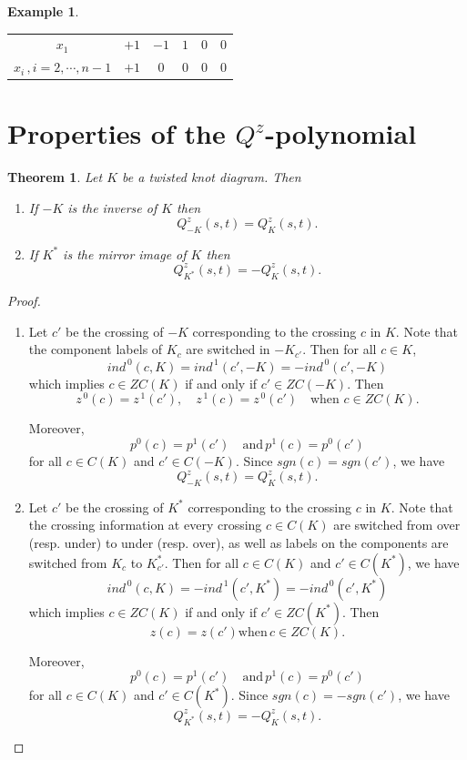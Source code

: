 \documentclass[10pt,a4paper,reqno]{amsart}
\newtheorem{theorem}{Theorem}[section]
\theoremstyle{definition}
\newtheorem{example}{Example}[section]
\theoremstyle{remark}
\begin{document}
\begin{example}
\begin{longtable}{|c|c|c|c|c|c|}
	$x_{1}$ &$+1$ & $-1$&  $1$ & $0$ & $0$ \\
	$x_{i}\,, i=2,\cdots,n-1$ & $+1$ &  $0$ & $0$ & $0$ & $0$ \\
\end{longtable}
\end{example}

\section{Properties of the  \texorpdfstring{$Q^{z}$}{Qz}-polynomial}\label{sec:operations}


\begin{theorem}
	Let $K$ be a twisted knot diagram. Then
	\begin{enumerate}
		\item If $-K$ is the inverse of $K$ then \[Q^{z}_{-K}(s,t)=Q^{z}_{K}(s,t).\]
		\item If $K^{*}$ is the mirror image of $K$ then \[Q^{z}_{K^{*}}(s,t)=-Q^{z}_{K}(s,t).\]
	\end{enumerate}
\end{theorem}
\begin{proof}
\begin{enumerate}
	\item Let $c'$ be the crossing of $-K$ corresponding to the crossing $c$ in $K$. Note that the component labels of $K_{c}$ are switched in $-K_{c'}$. Then for all $c \in K$, $$ind^{\,0}(c,K)=ind^{\,1}(c',-K)= -ind^{\,0}(c',-K)$$ which implies $c \in ZC(K)$ if and only if $c' \in ZC(-K)$. Then
	 \[z^{\,0}(c)=z^{\,1}(c'), \quad z^{\,1}(c)=z^{\,0}(c')\quad \text{when} \,\, c \in ZC(K)  .\]

	Moreover, $$p^{0}(c)=p^{1}(c')\quad \text{and}\, p^{1}(c)=p^{0}(c')$$ for all $c \in C(K)$ and $c' \in C(-K)$. Since  $sgn(c) = sgn(c')$, we have $$Q^{z}_{-K}(s,t)=Q^{z}_{K}(s,t).$$
	
	\item Let $c'$ be the crossing of $K^{*}$ corresponding to the crossing $c$ in $K$. Note that the crossing information at every crossing $c \in C(K)$ are switched from over (resp. under) to under (resp. over), as well as labels on the components are switched from $K_{c}$ to $K^{*}_{c'}$. Then for all $c \in C(K)$ and $c' \in C(K^{*})$, we have  $$ind^{\,0}(c,K)=-ind^{\,1}(c',K^{*})= -ind^{\,0}(c',K^{*})$$ which implies $c \in ZC(K)$ if and only if $c' \in ZC(K^{*})$. Then
\[z(c)=z(c') \text{when} \,
	c \in ZC(K).\]
	
	Moreover, $$p^{0}(c)=p^{1}(c')\quad \text{and}\, p^{1}(c)=p^{0}(c')$$ for all $c \in C(K)$ and $c' \in C(K^{*})$. Since  $sgn(c) = -sgn(c')$, we have  $$Q^{z}_{K^{*}}(s,t)=-Q^{z}_{K}(s,t).$$
\end{enumerate}
\end{proof}
\end{document}
